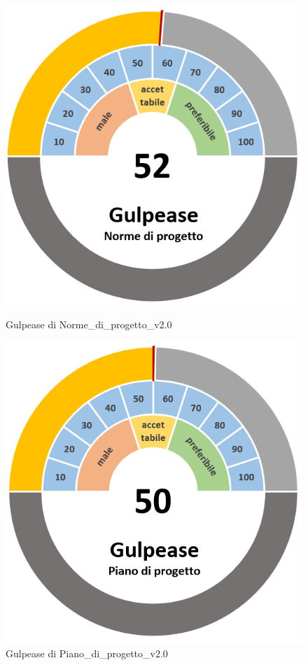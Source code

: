 \begin{figure}[H]
    \centering
    \begin{minipage}[b]{0.45\textwidth}
        \centering
        \includegraphics[width=\textwidth]{GulpeaseNdp.png}
        \caption{Gulpease di Norme\_di\_progetto\_v2.0}
    \end{minipage}
    \hfill
    \begin{minipage}[b]{0.45\textwidth}
        \centering
        \includegraphics[width=\textwidth]{GulpeasePdp.png}
        \caption{Gulpease di Piano\_di\_progetto\_v2.0}
    \end{minipage}
\end{figure}
